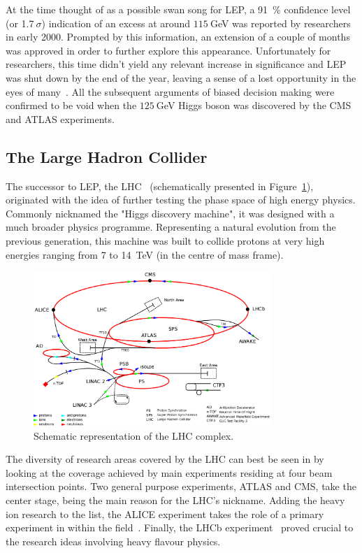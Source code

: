 \hspace{10pt} At the time thought of as a possible swan song for LEP, a 91~\% confidence level (or 1.7$~\sigma$) indication of an excess at around $115~$GeV was reported by researchers in early 2000. Prompted by this information, an extension of a couple of months was approved in order to further explore this appearance. Unfortunately for researchers, this time didn't yield any relevant increase in significance and LEP was shut down by the end of the year, leaving a sense of a lost opportunity in the eyes of many~\cite{LEP_searches}. All the subsequent arguments of biased decision making were confirmed to be void when the $125~$GeV Higgs boson was discovered by the CMS and ATLAS experiments.


\subsection{The Large Hadron Collider}
\hspace{10pt} The successor to LEP, the LHC~\cite{LHC_TDR} (schematically presented in Figure~\ref{fig:lhc}), originated with the idea of further testing the phase space of high energy physics. Commonly nicknamed the "Higgs discovery machine", it was designed with a much broader physics programme. Representing a natural evolution from the previous generation, this machine was built to collide protons at very high energies ranging from 7 to 14~TeV (in the centre of mass frame).

\begin{figure}[htbp]
  \centering
    \includegraphics[width=0.8\textwidth]{CMS_experiment/LHC.png}
  \caption[Schematic representation of the LHC complex.]{Schematic representation of the LHC complex.}
  \label{fig:lhc}
\end{figure}

\hspace{10pt} The diversity of research areas covered by the LHC can best be seen in by looking at the coverage achieved by main experiments residing at four beam intersection points. Two general purpose experiments, ATLAS and CMS, take the center stage, being the main reason for the LHC's nickname. Adding the heavy ion research to the list, the ALICE experiment takes the role of a primary experiment in within the field~\cite{ALICE_paper}. Finally, the LHCb experiment~\cite{LHCb_paper} proved crucial to the research ideas involving heavy flavour physics.

